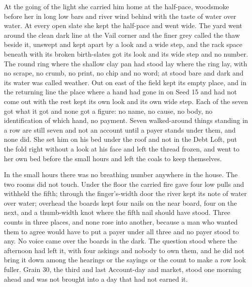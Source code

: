 At the going of the light she carried him home at the half-pace, woodsmoke before her in long low bars and river wind behind with the taste of water over water. At every open slate she kept the half-pace and went wide. The yard went around the clean dark line at the Vail corner and the finer grey called the thaw beside it, unswept and kept apart by a look and a wide step, and the rack space beneath  with its broken birth-slates got its look and its wide step and no number. The round ring where the shallow clay pan had stood lay where the ring lay, with no scrape, no crumb, no print, no chip and no word; at   stood bare and dark and its water was called weather. Out on  east of  the field kept its empty place, and in the returning line the place where a hand had gone in on Seed 15 and had not come out with the rest kept its own look and its own wide step. Each of the seven got what it got and none got a figure: no name, no cause, no body, no identification of which hand, no payment. Seven walked-around things standing in a row are still seven and not an account until a payer stands under them, and none did. She set him on his bed under the roof and not in the Debt Loft, put the fold right without a look at his face and left the thread frozen, and went to her own bed before the small hours and left the coals to keep themselves.

In the small hours there was no breathing number anywhere in the house. The two rooms did not touch. Under the floor the carried fire gave four low pulls and withheld the fifth; through the finger's-width door the river kept its note of water over water; overhead the boards kept four nails on the near board, four on the next, and a thumb-width knot where the fifth nail should have stood. Three counts in three places, and none rose into another, because a man who wanted them to agree would have to put a payer under all three and no payer stood to any. No voice came over the boards in the dark. The question stood where the afternoon had left it, with four askings and nobody to own them, and he did not bring it down among the hearings or the sayings or the count to make a row look fuller. Grain 30, the third and last Account-day and market, stood one morning ahead and was not brought into a day that had not earned it.

